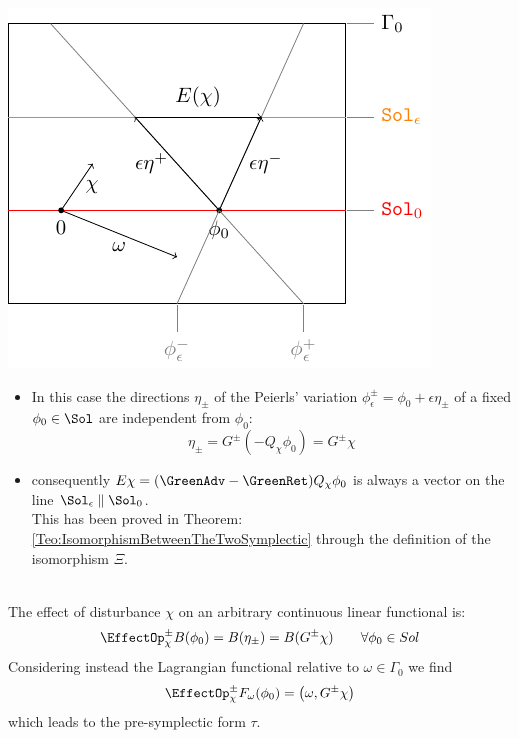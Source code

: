 \documentclass[Main]{subfiles}
\begin{document}
		
		
		\vspace{1mm}		
		\begin{minipage}{0.5\textwidth}
			\includegraphics[width=\textwidth]{Pictures/compsupp_GeometricPicture2}
		\end{minipage}
		\begin{minipage}{0.5\textwidth}
			\begin{itemize}
				\item In this case the directions $\eta_\pm$ of the Peierls' variation $\phi_\epsilon^\pm = \phi_0 + \epsilon \eta_\pm$ of a fixed $\phi_0 \in \Sol $ are independent from $\phi_0$:
				\begin{displaymath}
					\eta_\pm = G^\pm (- Q_\chi \phi_0 ) = G^\pm \chi
				\end{displaymath}
				\item consequently $E \chi = (\GreenAdv - \GreenRet) Q_\chi \phi_0$ is always a vector on the line $\Sol_\epsilon \parallel \Sol_0$.\\
				This has been proved in Theorem:	\ref{Teo:IsomorphismBetweenTheTwoSymplectic} through the definition of the isomorphism $\Xi$.
			\end{itemize}
		\end{minipage}
		\vspace{1mm}\\		
	
		The effect of disturbance $\chi$ on an arbitrary continuous linear functional is:
		\begin{displaymath}
			\EffectOp_\chi^\pm B (\phi_0)=B (\eta_\pm) = B ( G^\pm \chi) \qquad \forall \phi_0 \in Sol
		\end{displaymath}		
		Considering instead the Lagrangian functional relative to $\omega \in \Gamma_0$ we find
		\begin{displaymath}
			\EffectOp_\chi^\pm F_\omega (\phi_0) = \left( \omega , G^\pm \chi \right)
		\end{displaymath}
		which leads to the pre-symplectic form $\tau$.
		
\end{document}
